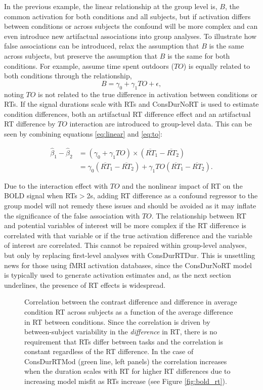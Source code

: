 \documentclass[sn-mathphys,Numbered, super, referee, lineno]{sn-jnl}
\begin{document}
In the previous example, the linear relationship at the group level is, $B$, the common activation for both conditions and all subjects, but if activation differs between conditions or across subjects the confound will be more complex and can even introduce new artifactual associations into group analyses.  To illustrate how false associations can be introduced, relax the assumption that $B$ is the same across subjects, but preserve the assumption that $B$ is the same for both conditions.  For example, assume time spent outdoors ($TO$) is equally related to both conditions through the relationship, 
\begin{equation}\label{eq:to}
B=\gamma_0 + \gamma_1 TO + \epsilon,
\end{equation}
noting $TO$ is not related to the true difference in activation between conditions or RTs. If the signal durations scale with RTs and ConsDurNoRT is used to estimate condition differences, both an artifactual  RT difference effect and an artifactual RT difference by $TO$ interaction are introduced to group-level data.  This can be seen by combining equations \ref{eq:linear} and \ref{eq:to}:

\begin{align}
  \hat\beta_1 - \hat\beta_2 &= (\gamma_0 + \gamma_1 TO)\times \left(\overline{RT}_1 - \overline{RT}_2\right) \\ \nonumber
  &= \gamma_0\left(\overline{RT}_1 - \overline{RT}_2\right) + \gamma_1 TO \left(\overline{RT}_1 - \overline{RT}_2\right).
\end{align}

Due to the interaction effect with $TO$ and the nonlinear impact of RT on the BOLD signal when RTs$>$2s, adding RT difference as a confound regressor to the group model will not remedy these issues and should be avoided as it may inflate the significance of the false association with $TO$.  The relationship between RT and potential variables of interest will be more complex if the RT difference is correlated with that variable or if the true activation difference and the variable of interest are correlated. This cannot be repaired within group-level analyses, but only by replacing  first-level analyses with ConsDurRTDur. This is unsettling news for those using fMRI activation databases, since the ConsDurNoRT model is typically used to generate activation estimates and, as the next section underlines, the presence of RT effects is widespread.

\begin{figure}[ht!]
  \centering
   \caption{Correlation between the contrast difference and difference in average condition RT across subjects as a function of the average difference in RT between conditions.  Since the correlation is driven by between-subject variability in the \emph{difference} in RT, there is no requirement that RTs differ between tasks and the correlation is constant regardless of the RT difference. In the case of ConsDurRTMod (green line, left panels) the correlation increases when the duration scales with RT for higher RT differences due to increasing model misfit as RTs increase (see Figure \ref{fig:bold_rt}).}
  \label{fig:rt-cor}
\end{figure}
\end{document}
